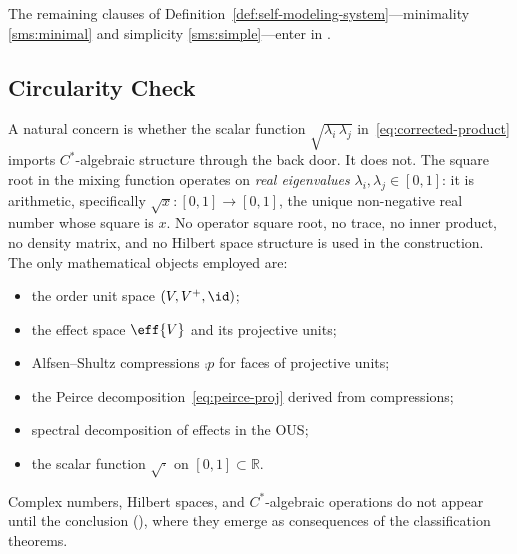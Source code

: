 \documentclass[11pt]{article}
\begin{document}
The remaining clauses of
Definition~\ref{def:self-modeling-system}---minimality
\ref{sms:minimal} and simplicity \ref{sms:simple}---enter
in .
\label{ass:faithful}%
\label{ass:minimal}%
\label{ass:simple}%


\subsection{Circularity Check}
\label{sec:circularity}

A natural concern is whether the scalar function
$\sqrt{\lambda_{i}\, \lambda_{j}}$
in~\eqref{eq:corrected-product} imports $C^{*}$-algebraic structure
through the back door.  It does not.  The square root in the mixing
function operates on \emph{real eigenvalues}
$\lambda_{i}, \lambda_{j} \in [0,1]$: it is arithmetic, specifically
$\sqrt{x} : [0,1] \to [0,1]$, the unique non-negative real number
whose square is $x$.  No operator square root, no trace, no inner
product, no density matrix, and no Hilbert space structure is used in
the construction.  The only mathematical objects employed are:
\begin{itemize}
  \item the order unit space $(V, V^{+}, \id)$;
  \item the effect space $\eff{V}$ and its projective units;
  \item Alfsen--Shultz compressions $\comp{p}$ for faces of
    projective units;
  \item the Peirce decomposition~\eqref{eq:peirce-proj} derived from
    compressions;
  \item spectral decomposition of effects in the OUS;
  \item the scalar function $\sqrt{\cdot}$ on
    $[0,1] \subset \mathbb{R}$.
\end{itemize}
Complex numbers, Hilbert spaces, and $C^{*}$-algebraic operations do
not appear until the conclusion (), where they
emerge as consequences of the classification theorems.






\end{document}
